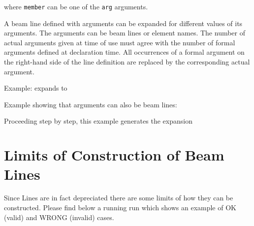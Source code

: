 where \texttt{member} can be one of the \texttt{arg} arguments.

A beam line defined with arguments can be expanded for different values
of its arguments.  
The arguments can be beam lines or element names. The number of actual
arguments given at time of use must agree with the number of formal
arguments defined at declaration time. All occurrences of a formal
argument on the right-hand side of the line definition are replaced by
the corresponding actual argument.  

Example:
expands to 

Example showing that arguments can also be beam lines:

Proceeding step by step, this example generates the expansion 


\section{Limits of Construction of Beam Lines}  

Since Lines are in fact depreciated there are some limits of how they
can be constructed. Please find below a running \madx run which shows an
example of OK (valid) and WRONG (invalid) cases.   

